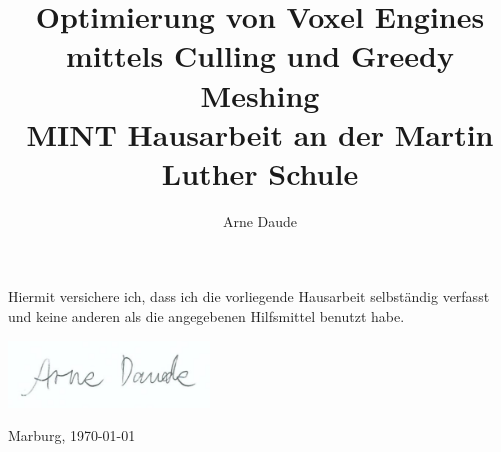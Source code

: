 \documentclass[12pt,oneside]{article}
\begin{document}
\title{
	Optimierung von Voxel Engines
	\\ mittels Culling und Greedy Meshing
	\\ \large{MINT Hausarbeit an der Martin Luther Schule}
}
\author{Arne Daude}
\maketitle

\vspace{1cm}

\tableofcontents

\pagebreak


{  }

{  }

\pagebreak

{  }

\pagebreak

{  }

{  }

\vspace*{\fill}

{
\setlength{\parindent}{0pt}

Hiermit versichere ich, dass ich die vorliegende
Hausarbeit selbständig verfasst und keine anderen
als die angegebenen Hilfsmittel benutzt habe.

\includegraphics[width=0.4\textwidth]{../assets/signature.png}

Marburg, \today
}

\vspace{1cm}
\end{document}
